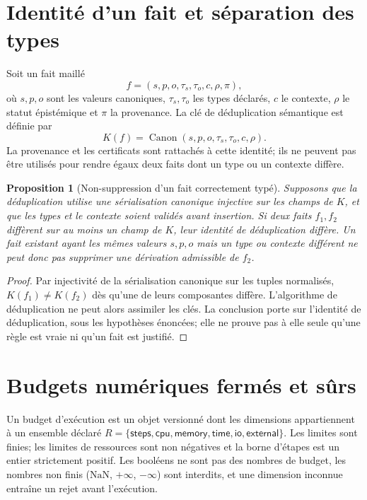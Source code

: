 \documentclass[11pt,a4paper,openany]{book}
\theoremstyle{definition}
\theoremstyle{plain}
\newtheorem{proposition}[definition]{Proposition}
\theoremstyle{remark}
\begin{document}
\section{Identité d'un fait et séparation des types}
Soit un fait maillé
\[
f=(s,p,o,\tau_s,\tau_o,c,\rho,\pi),
\]
où $s,p,o$ sont les valeurs canoniques, $\tau_s,\tau_o$ les types déclarés, $c$ le contexte, $\rho$ le statut épistémique et $\pi$ la provenance. La clé de déduplication sémantique est définie par
\[
K(f)=\operatorname{Canon}(s,p,o,\tau_s,\tau_o,c,\rho).
\]
La provenance et les certificats sont rattachés à cette identité; ils ne peuvent pas être utilisés pour rendre égaux deux faits dont un type ou un contexte diffère.

\begin{proposition}[Non-suppression d'un fait correctement typé]
Supposons que la déduplication utilise une sérialisation canonique injective sur les champs de $K$, et que les types et le contexte soient validés avant insertion. Si deux faits $f_1,f_2$ diffèrent sur au moins un champ de $K$, leur identité de déduplication diffère. Un fait existant ayant les mêmes valeurs $s,p,o$ mais un type ou contexte différent ne peut donc pas supprimer une dérivation admissible de $f_2$.
\end{proposition}
\begin{proof}
Par injectivité de la sérialisation canonique sur les tuples normalisés, $K(f_1)\ne K(f_2)$ dès qu'une de leurs composantes diffère. L'algorithme de déduplication ne peut alors assimiler les clés. La conclusion porte sur l'identité de déduplication, sous les hypothèses énoncées; elle ne prouve pas à elle seule qu'une règle est vraie ni qu'un fait est justifié.
\end{proof}

\section{Budgets numériques fermés et sûrs}
Un budget d'exécution est un objet versionné dont les dimensions appartiennent à un ensemble déclaré $R=\{\mathsf{steps},\mathsf{cpu},\mathsf{memory},\mathsf{time},\mathsf{io},\mathsf{external}\}$. Les limites sont finies; les limites de ressources sont non négatives et la borne d'étapes est un entier strictement positif. Les booléens ne sont pas des nombres de budget, les nombres non finis ($\mathrm{NaN}$, $+\infty$, $-\infty$) sont interdits, et une dimension inconnue entraîne un rejet avant l'exécution.
\end{document}
